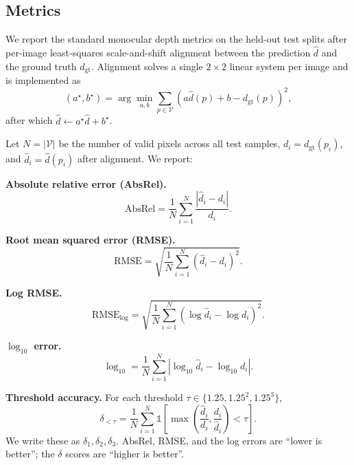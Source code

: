 \documentclass[10pt,twocolumn,letterpaper]{article}
\begin{document}
\subsection{Metrics}
\label{sec:metrics}

We report the standard monocular depth metrics on the held-out test
splits after per-image least-squares scale-and-shift alignment between
the prediction $\hat d$ and the ground truth $d_{\text{gt}}$. Alignment
solves a single $2{\times}2$ linear system per image and is implemented
as
\begin{equation}
(a^{\star}, b^{\star}) = \arg\min_{a,b}\sum_{p\in\mathcal{V}}\left(a\hat d(p) + b - d_{\text{gt}}(p)\right)^2,
\end{equation}
after which $\hat d \leftarrow a^{\star}\hat d + b^{\star}$.

Let $N=|\mathcal{V}|$ be the number of valid pixels across all test
samples, $d_i = d_{\text{gt}}(p_i)$, and $\hat d_i = \hat d(p_i)$ after
alignment. We report:

\noindent\textbf{Absolute relative error (AbsRel).}
\begin{equation}
\text{AbsRel} = \frac{1}{N}\sum_{i=1}^{N} \frac{|\hat d_i - d_i|}{d_i}.
\end{equation}

\noindent\textbf{Root mean squared error (RMSE).}
\begin{equation}
\text{RMSE} = \sqrt{\frac{1}{N}\sum_{i=1}^{N} (\hat d_i - d_i)^2}.
\end{equation}

\noindent\textbf{Log RMSE.}
\begin{equation}
\text{RMSE}_{\log} = \sqrt{\frac{1}{N}\sum_{i=1}^{N} (\log\hat d_i - \log d_i)^2}.
\end{equation}

\noindent\textbf{$\log_{10}$ error.}
\begin{equation}
\log_{10} = \frac{1}{N}\sum_{i=1}^{N}\left|\log_{10}\hat d_i - \log_{10} d_i\right|.
\end{equation}

\noindent\textbf{Threshold accuracy.} For each threshold
$\tau\in\{1.25, 1.25^2, 1.25^3\}$,
\begin{equation}
\delta_{<\tau} = \frac{1}{N}\sum_{i=1}^{N} \mathbb{1}\!\left[\max\!\left(\frac{\hat d_i}{d_i}, \frac{d_i}{\hat d_i}\right) < \tau \right].
\end{equation}
We write these as $\delta_1, \delta_2, \delta_3$. AbsRel, RMSE, and the
log errors are ``lower is better''; the $\delta$ scores are
``higher is better''.
\end{document}
